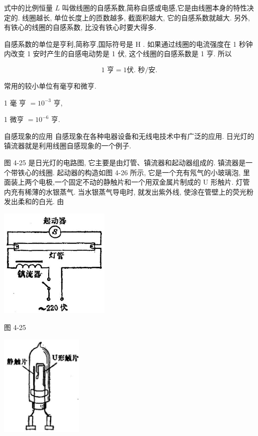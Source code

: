 \documentclass[10pt]{article}
\begin{document}
式中的比例恒量 \(L\) 叫做线圈的自感系数,简称自感或电感,它是由线圈本身的特性决定的. 线圈越长, 单位长度上的匝数越多, 截面积越大, 它的自感系数就越大. 另外, 有铁心的线圈的自感系数, 比没有铁心时要大得多.

自感系数的单位是亨利,简称亨,国际符号是 \(\mathrm{H}\) . 如果通过线圈的电流强度在 1 秒钟内改变 1 安时产生的自感电动势是 1 伏, 这个线圈的自感系数是 1 亨. 所以

\[
\text{1 亨} = 1\text{伏. 秒/安.}
\]

常用的较小单位有毫亨和微亨.

1 毫 亨 \(= {10}^{-3}\) 亨,

1 微亨 \(= {10}^{-6}\) 亨.

自感现象的应用 自感现象在各种电器设备和无线电技术中有广泛的应用. 日光灯的镇流器就是利用线圈自感现象的一个例子.

图 4-25 是日光灯的电路图, 它主要是由灯管、镇流器和起动器组成的. 镇流器是一个带铁心的线圈. 起动器的构造如图 4-26 所示, 它是一个充有氖气的小玻璃泡, 里面装上两个电极,一个固定不动的静触片和一个用双金属片制成的 \(\mathrm{U}\) 形触片. 灯管内充有稀薄的水银蒸气. 当水银蒸气导电时, 就发出紫外线, 使涂在管壁上的荧光粉发出柔和的白光. 由

\begin{center}
\includegraphics[max width=0.4\textwidth]{images/01913056-1f15-74d8-9184-9aab52c9d66b_151_310152.jpg}
\end{center}

图 4-25

\begin{center}
\includegraphics[max width=0.3\textwidth]{images/01913056-1f15-74d8-9184-9aab52c9d66b_151_828302.jpg}
\end{center}
\end{document}
